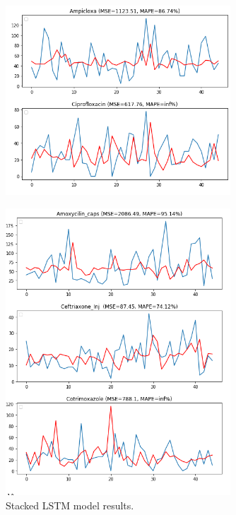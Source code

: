 \documentclass[12pt]{report}
\begin{document}
\begin{figure}[H]%
\begin {center}
\includegraphics[width=0.75\textwidth]{images/stacked (3).png}
\label{fig:ecg}
\end {center}
\end{figure}

\begin{figure}[H]%
\begin {center}
\includegraphics[width=0.75\textwidth]{images/stacked (2).png}
\caption{Stacked LSTM model results.}
\label{fig:ecg}
\end {center}
\end{figure}
\end{document}
